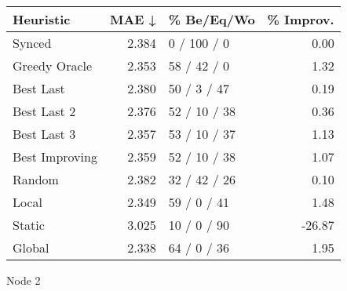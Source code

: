 \begin{tabular}{lrlr}
\toprule
\textbf{Heuristic} & \textbf{MAE ↓} & \textbf{\% Be/Eq/Wo} & \textbf{\% Improv.} \\
\midrule
            Synced &          2.384 &          0 / 100 / 0 &                0.00 \\
     Greedy Oracle &          2.353 &          58 / 42 / 0 &                1.32 \\
         Best Last &          2.380 &          50 / 3 / 47 &                0.19 \\
       Best Last 2 &          2.376 &         52 / 10 / 38 &                0.36 \\
       Best Last 3 &          2.357 &         53 / 10 / 37 &                1.13 \\
    Best Improving &          2.359 &         52 / 10 / 38 &                1.07 \\
            Random &          2.382 &         32 / 42 / 26 &                0.10 \\
             Local &          2.349 &          59 / 0 / 41 &                1.48 \\
            Static &          3.025 &          10 / 0 / 90 &              -26.87 \\
            Global &          2.338 &          64 / 0 / 36 &                1.95 \\
\bottomrule
\end{tabular}
\caption{Node 2}
\label{tab:hr_iid_lr01_le1_bs4_2}
